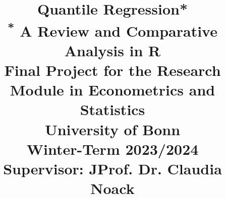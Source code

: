 \documentclass[conference]{IEEEtran}
\begin{document}
\title{Quantile Regression*\\
{\footnotesize \textsuperscript{*}
A Review and Comparative Analysis in R
\\
Final Project for the Research Module in Econometrics and Statistics
\\
University of Bonn
\\
Winter-Term 2023/2024
\\
Supervisor: JProf. Dr. Claudia Noack}
}

\author{
\and
{}
\and
{}
}

\maketitle
\end{document}
